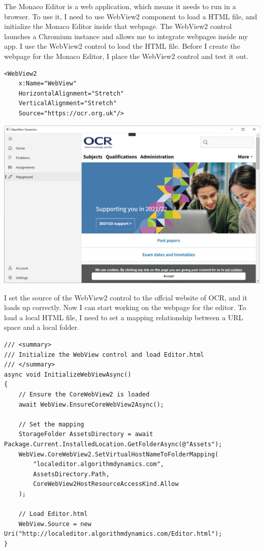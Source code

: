 \documentclass[a4paper]{report}
\begin{document}
The Monaco Editor is a web application, which means it needs to run in a browser. To use it, I need to use WebView2 component to load a HTML file, and initialize the Monaco Editor inside that webpage. The WebView2 control launches a Chromium instance and allows me to integrate webpages inside my app. I use the WebView2 control to load the HTML file. Before I create the webpage for the Monaco Editor, I place the WebView2 control and test it out.

\begin{verbatim}
<WebView2 
    x:Name="WebView"
    HorizontalAlignment="Stretch"
    VerticalAlignment="Stretch"
    Source="https://ocr.org.uk"/>
\end{verbatim}

\includegraphics[width=\textwidth, height=\textheight, keepaspectratio]{PlaygroundPage-WebView2-Webpage}

I set the source of the WebView2 control to the offcial website of OCR, and it loads up correctly. Now I can start working on the webpage for the editor. To load a local HTML file, I need to set a mapping relationship between a URL space and a local folder.

\begin{verbatim}
/// <summary>
/// Initialize the WebView control and load Editor.html
/// </summary>
async void InitializeWebViewAsync()
{
    // Ensure the CoreWebView2 is loaded
    await WebView.EnsureCoreWebView2Async();

    // Set the mapping
    StorageFolder AssetsDirectory = await Package.Current.InstalledLocation.GetFolderAsync(@"Assets");
    WebView.CoreWebView2.SetVirtualHostNameToFolderMapping(
        "localeditor.algorithmdynamics.com",
        AssetsDirectory.Path,
        CoreWebView2HostResourceAccessKind.Allow
    );

    // Load Editor.html
    WebView.Source = new Uri("http://localeditor.algorithmdynamics.com/Editor.html");
}
\end{verbatim}
\end{document}
